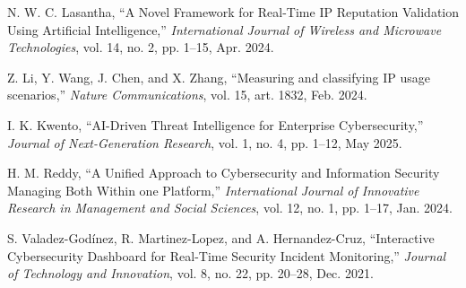 \begin{thebibliography}{15}
N. W. C. Lasantha, ``A Novel Framework for Real-Time IP Reputation Validation Using Artificial Intelligence,'' \textit{International Journal of Wireless and Microwave Technologies}, vol. 14, no. 2, pp. 1--15, Apr. 2024.

Z. Li, Y. Wang, J. Chen, and X. Zhang, ``Measuring and classifying IP usage scenarios,'' \textit{Nature Communications}, vol. 15, art. 1832, Feb. 2024.

I. K. Kwento, ``AI-Driven Threat Intelligence for Enterprise Cybersecurity,'' \textit{Journal of Next-Generation Research}, vol. 1, no. 4, pp. 1--12, May 2025.

H. M. Reddy, ``A Unified Approach to Cybersecurity and Information Security Managing Both Within one Platform,'' \textit{International Journal of Innovative Research in Management and Social Sciences}, vol. 12, no. 1, pp. 1--17, Jan. 2024.

S. Valadez-Godínez, R. Martinez-Lopez, and A. Hernandez-Cruz, ``Interactive Cybersecurity Dashboard for Real-Time Security Incident Monitoring,'' \textit{Journal of Technology and Innovation}, vol. 8, no. 22, pp. 20--28, Dec. 2021.
\end{thebibliography}
